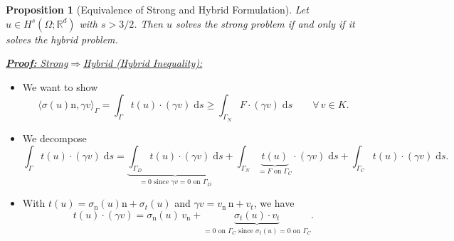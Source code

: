 \documentclass[10pt,aspectratio=169]{beamer}
\newtheorem{proposition}{Proposition}[section]
\def\R{{\mathbb R}}
\def\d{{\mathrm{d}}}
\def\ds{{\d s}}
\begin{document}
\begin{frame}
	\begin{proposition}[Equivalence of Strong and Hybrid Formulation]
		Let $u\in H^s(\Omega;\R^d)$ with $s>3/2$. Then $u$ solves the strong problem if and only if it solves the hybrid problem.
	\end{proposition}
	\underline{\textbf{\em Proof:} {\em Strong\enspace}$\Longrightarrow${\em\enspace Hybrid (Hybrid Inequality):}}
	\begin{itemize}
		\item We want to show
		      \begin{equation*}
			      \langle \sigma(u)\mathrm n,\gamma v\rangle_\Gamma
			      =
			      \int_{\Gamma} t(u)\cdot(\gamma v)\;\ds \ge \int_{\Gamma_N} F\cdot(\gamma v)\;\ds
			      \qquad
			      \forall\, v\in K.
		      \end{equation*}
		\item We decompose
		      \begin{equation*}
			      \int_\Gamma t(u)\cdot(\gamma v)\;\ds =\underbrace{\int_{\Gamma_D} t(u)\cdot(\gamma v)\;\ds}_{=0\text{ since } \gamma v= 0 \text{ on }\Gamma_D}+\int_{\Gamma_N} \underbrace{t(u)}_{= F\text{ on }\Gamma_C}\cdot(\gamma v)\;\ds+\int_{\Gamma_C} t(u)\cdot(\gamma v)\;\ds.
		      \end{equation*}
		\item With $t(u) = \sigma_\mathrm{n}(u)\mathrm{n}+\sigma_t(u)$ and $\gamma v = v_\mathrm{n}\,\mathrm{n}+v_t$, we have
		      \begin{equation*}
			      t(u)\cdot(\gamma v) = \sigma_\mathrm{n}(u)\,v_\mathrm{n}+\underbrace{\sigma_t(u)\cdot v_t}_{=0\text{ on }\Gamma_C \text{ since }\sigma_t(u)=0\text{ on }\Gamma_C}.
		      \end{equation*}
	\end{itemize}
\end{frame}
\end{document}
